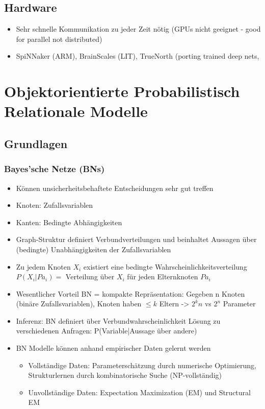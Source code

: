\documentclass[paper=a4, fontsize=11pt]{scrartcl} %
\numberwithin{equation}{section} %
\numberwithin{figure}{section} %
\numberwithin{table}{section} %
\begin{document}
\subsection{Hardware}

\begin{itemize}
\item Sehr schnelle Kommunikation zu jeder Zeit nötig (GPUs nicht geeignet - good for parallel not distributed)
\item SpiNNaker (ARM), BrainScales (LIT), TrueNorth (porting trained deep nets,
\end{itemize}

\section{Objektorientierte Probabilistisch Relationale Modelle}

\subsection{Grundlagen}

\subsubsection{Bayes'sche Netze (BNs)}

\begin{itemize}
\item Können unsicherheitsbehaftete Entscheidungen sehr gut treffen
\item Knoten: Zufallsvariablen
\item Kanten: Bedingte Abhängigkeiten
\item Graph-Struktur definiert Verbundverteilungen und beinhaltet Aussagen über (bedingte) Unabhängigkeiten der Zufallsvariablen
\item Zu jedem Knoten $X_i$ existiert eine bedingte Wahrscheinlichkeitsverteilung $P(X_i|Pa_i) =$ Verteilung über $X_i$ für jeden Elternknoten $Pa_i$
\item Wesentlicher Vorteil BN = kompakte Repräsentation: Gegeben n Knoten (binäre Zufallsvariablen), Knoten haben $\le k$ Eltern -> $2^k n$ vs $2^n$ Parameter
\item Inferenz: BN definiert über Verbundwahrscheinlichkeit Lösung zu verschiedenen Anfragen: P(Variable|Aussage über andere)
\item BN Modelle können anhand empirischer Daten gelernt werden
\begin{itemize}
\item Vollständige Daten: Parameterschätzung durch numerische Optimierung, Strukturlernen durch kombinatorische Suche (NP-vollständig)
\item Unvollständige Daten: Expectation Maximization (EM) und Structural EM
\end{itemize}
\end{itemize}
\end{document}
